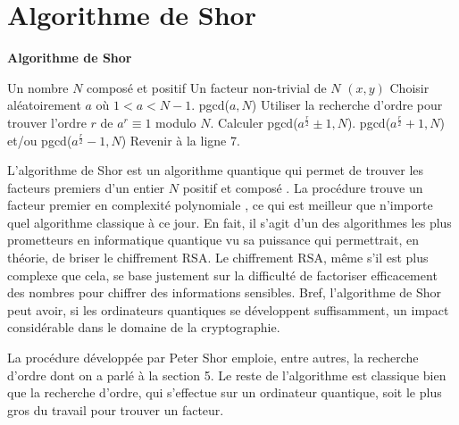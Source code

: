 \section{Algorithme de Shor}
\begin{algorithm}[H]
    \caption*{\textbf{Algorithme de Shor}}
    \begin{algorithmic}[1]
    \REQUIRE Un nombre $N$ composé et positif
    \ENSURE Un facteur non-trivial de $N$
    \ENDIF
        \RETURN $(x,y)$
    \ENDIF
    \STATE Choisir aléatoirement $a$ où $1 < a < N-1$. 
        \RETURN pgcd($a,N$)
    \ENDIF
    \STATE Utiliser la recherche d'ordre pour trouver l'ordre $r$ de $a^r \equiv 1$ modulo $N$.
        \STATE Calculer pgcd($a^{\frac{r}{2}} \pm 1, N$). 
            \RETURN pgcd($a^{\frac{r}{2}} + 1, N$) et/ou pgcd($a^{\frac{r}{2}} - 1, N$)
        \ENDIF
    \ENDIF Revenir à la ligne 7.
    \end{algorithmic}
    \end{algorithm}

L'algorithme de Shor est un algorithme quantique qui permet de trouver les facteurs premiers d'un entier $N$ positif et composé \cite{Shor_1997}. La procédure trouve un facteur premier en complexité polynomiale \cite{nielsen00}, ce qui est meilleur que n'importe quel algorithme classique à ce jour. En fait, il s'agit d'un des algorithmes les plus prometteurs en informatique quantique vu sa puissance qui permettrait, en théorie, de briser le chiffrement RSA. Le chiffrement RSA, même s'il est plus complexe que cela, se base justement sur la difficulté de factoriser efficacement des nombres pour chiffrer des informations sensibles. Bref, l'algorithme de Shor peut avoir, si les ordinateurs quantiques se développent suffisamment, un impact considérable dans le domaine de la cryptographie. 

La procédure développée par Peter Shor emploie, entre autres, la recherche d'ordre dont on a parlé à la section 5. Le reste de l'algorithme est classique bien que la recherche d'ordre, qui s'effectue sur un ordinateur quantique, soit le plus gros du travail pour trouver un facteur. 

